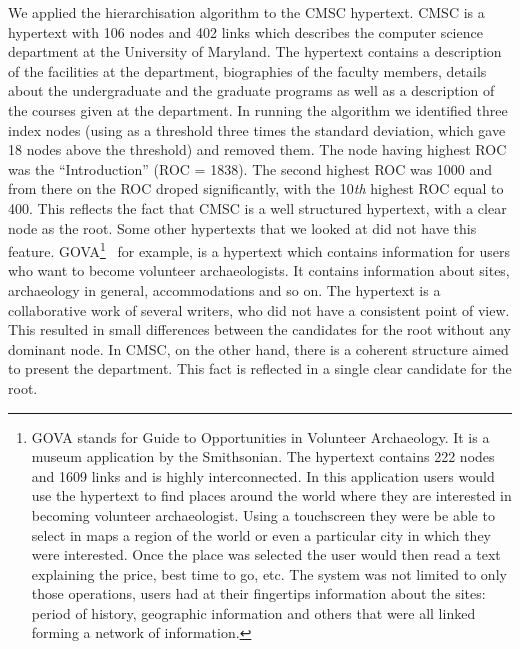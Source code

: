 \documentclass[twocolumn,10pt]{article}
\begin{document}
We applied the hierarchisation algorithm to the CMSC hypertext.  CMSC
is a hypertext with 106 nodes and 402 links which describes the
computer science department at the University of Maryland. The
hypertext contains a description of the facilities at the department,
biographies of the faculty members, details about the undergraduate
and the graduate programs as well as a description of the courses
given at the department.  In running the algorithm we identified three
index nodes (using as a threshold three times the standard deviation,
which gave 18 nodes above the threshold) and removed them.  The node
having highest ROC was the ``Introduction'' (ROC = 1838).  The second
highest ROC was 1000 and from there on the ROC droped significantly,
with the 10{\em th} highest ROC equal to 400.  This reflects the fact
that CMSC is a well structured hypertext, with a clear node as the
root. Some other hypertexts that we looked at did not have this
feature. GOVA\footnote{GOVA stands for Guide to Opportunities in
Volunteer Archaeology. It is a museum application by the Smithsonian. 
The hypertext contains 222 nodes and 1609 links and is highly
interconnected.  In this application users would use the hypertext to
find places around the world where they are interested in becoming
volunteer archaeologist. Using a touchscreen they were be able to
select in maps a region of the world or even a particular city in
which they were interested. Once the place was selected the user would
then read a text explaining the price, best time to go, etc. The
system was not limited to only those operations, users had at their
fingertips information about the sites: period of history, geographic
information and others that were all linked forming a network of
information.}~\cite{pla} for example, is a hypertext which contains
information for users who want to become volunteer archaeologists. It
contains information about sites, archaeology in general,
accommodations and so on. The hypertext is a collaborative work of
several writers, who did not have a consistent point of view. This
resulted in small differences between the candidates for the root
without any dominant node.  In CMSC, on the other hand, there is a
coherent structure aimed to present the department. This fact is
reflected in a single clear candidate for the root.
\end{document}
